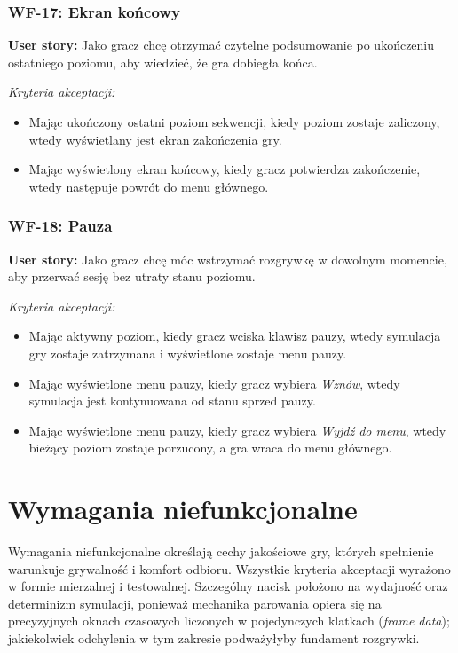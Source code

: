 \subsubsection*{WF-17: Ekran końcowy}
\textbf{User story:} Jako gracz chcę otrzymać czytelne podsumowanie po ukończeniu ostatniego poziomu, aby wiedzieć, że gra dobiegła końca.

\textit{Kryteria akceptacji:}
\begin{itemize}[noitemsep]
    \item Mając ukończony ostatni poziom sekwencji, kiedy poziom zostaje zaliczony, wtedy wyświetlany jest ekran zakończenia gry.
    \item Mając wyświetlony ekran końcowy, kiedy gracz potwierdza zakończenie, wtedy następuje powrót do menu głównego.
\end{itemize}

\subsubsection*{WF-18: Pauza}
\textbf{User story:} Jako gracz chcę móc wstrzymać rozgrywkę w dowolnym momencie, aby przerwać sesję bez utraty stanu poziomu.

\textit{Kryteria akceptacji:}
\begin{itemize}[noitemsep]
    \item Mając aktywny poziom, kiedy gracz wciska klawisz pauzy, wtedy symulacja gry zostaje zatrzymana i wyświetlone zostaje menu pauzy.
    \item Mając wyświetlone menu pauzy, kiedy gracz wybiera \textit{Wznów}, wtedy symulacja jest kontynuowana od stanu sprzed pauzy.
    \item Mając wyświetlone menu pauzy, kiedy gracz wybiera \textit{Wyjdź do menu}, wtedy bieżący poziom zostaje porzucony, a gra wraca do menu głównego.
\end{itemize}

\section{Wymagania niefunkcjonalne}

Wymagania niefunkcjonalne określają cechy jakościowe gry, których spełnienie warunkuje grywalność i komfort odbioru. Wszystkie kryteria akceptacji wyrażono w formie mierzalnej i testowalnej. Szczególny nacisk położono na wydajność oraz determinizm symulacji, ponieważ mechanika parowania opiera się na precyzyjnych oknach czasowych liczonych w pojedynczych klatkach (\textit{frame data}); jakiekolwiek odchylenia w tym zakresie podważyłyby fundament rozgrywki.

